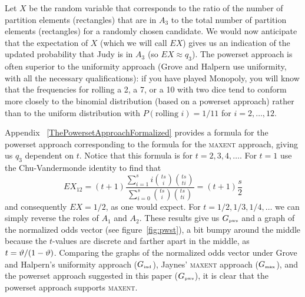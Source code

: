 \documentclass[12pt]{article}
\begin{document}
Let $X$ be the random variable that corresponds to the ratio of the
number of partition elements (rectangles) that are in $A_{3}$ to the
total number of partition elements (rectangles) for a randomly chosen
candidate. We would now anticipate that the expectation of $X$ (which
we will call $EX$) gives us an indication of the updated probability
that Judy is in $A_{3}$ (so $EX\approx{}q_{3}$). The powerset approach
is often superior to the uniformity approach (Grove and Halpern use
uniformity, with all the necessary qualifications): if you have played
Monopoly, you will know that the frequencies for rolling a 2, a 7, or
a 10 with two dice tend to conform more closely to the binomial
distribution (based on a powerset approach) rather than to the uniform
distribution with $P(\mbox{rolling }i)=1/11$ for $i=2,{\ldots},12$.

Appendix ~\ref{ThePowersetApproachFormalized} provides a formula for
the powerset approach corresponding to the formula for the
\textsc{maxent} approach, giving us $q_{3}$ dependent on $t$. Notice
that this formula is for $t=2,3,4,\ldots$. For $t=1$ use the
Chu-Vandermonde identity to find that
\begin{displaymath}
  EX_{12}=(t+1)\frac{\sum_{i=1}^{s}i\binom{ts}{i}\binom{ts}{ti}}{\sum_{i=0}^{s}\binom{ts}{i}\binom{ts}{ti}}=(t+1)\frac{s}{2}  
\end{displaymath}
and consequently $EX=1/2$, as one would expect. For
$t=1/2,1/3,1/4,\ldots$ we can simply reverse the roles of $A_{1}$ and
$A_{2}$. These results give us $G_{\mbox{\tiny pws}}$ and a graph of
the normalized odds vector (see figure~\ref{fig:pwst}), a bit bumpy
around the middle because the $t$-values are discrete and farther
apart in the middle, as $t={\vartheta}/(1-{\vartheta})$. Comparing the graphs of
the normalized odds vector under Grove and Halpern's uniformity
approach ($G_{\mbox{\tiny ind}}$), Jaynes' \textsc{maxent} approach
($G_{\mbox{\tiny max}}$), and the powerset approach suggested in this
paper ($G_{\mbox{\tiny pws}}$), it is clear that the powerset approach
supports \textsc{maxent}.
\end{document}

